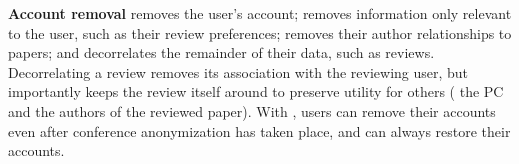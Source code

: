 \textbf{Account removal} \one{} removes the user's account; \two{} removes
information only relevant to the user, such as their review preferences;
\three{} removes their author relationships to papers; and \four{} decorrelates
the remainder of their data, such as reviews. %
%
Decorrelating a review removes its association with the reviewing user, but
importantly keeps the review itself around to preserve utility for others (\eg
the PC and the authors of the reviewed paper).
%
%
%
%
With \sys, users can remove their accounts even after conference anonymization has taken
place, and can always restore their accounts.%
%

